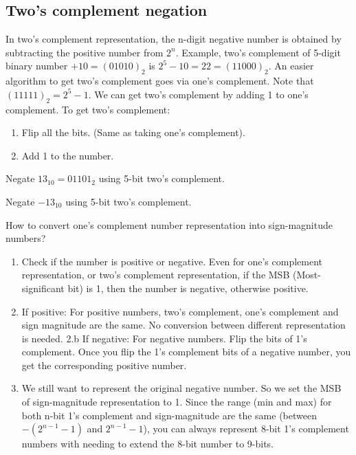 \subsection{Two's complement negation}
In two's complement representation, the n-digit negative number is obtained by
subtracting the positive number from $2^{n}$. Example, two's
complement of 5-digit binary number $+10 = (01010)_2$ is $2^5 - 10 = 22 =
(11000)_2$. An easier algorithm to get two's complement goes via one's
complement. Note that $(11111)_2 = 2^5-1$. We can get two's complement by adding
1 to one's complement. To get two's complement:
\begin{enumerate}
\item Flip all the bits. (Same as taking one's complement).
\item Add 1 to the number.
\end{enumerate}

\noindent Negate $13_{10} = 01101_2$ using 5-bit two's complement.
\vspace{10em}

\noindent Negate $-13_{10}$ using 5-bit two's complement.
\vspace{10em}


How to convert one's complement number representation into sign-magnitude numbers?
\begin{enumerate}
\item Check if the number is positive or negative. Even for one's complement representation, or two's complement representation, if the MSB (Most-significant bit) is 1, then the number is negative, otherwise positive.
\item If positive: For positive numbers, two's complement, one's complement and sign magnitude are the same. No conversion between different representation is needed.
2.b If negative: For negative numbers. Flip the bits of 1's complement. Once you flip the 1's complement bits of a negative number, you get the corresponding positive number.
\item We still want to represent the original negative number. So we set the MSB of sign-magnitude representation to 1. Since the range (min and max) for both n-bit 1's complement and sign-magnitude are the same (between $-(2^{n-1}-1)$ and $2^{n-1}-1$), you can always represent 8-bit 1's complement numbers with needing to extend the 8-bit number to 9-bits.
\end{enumerate}

